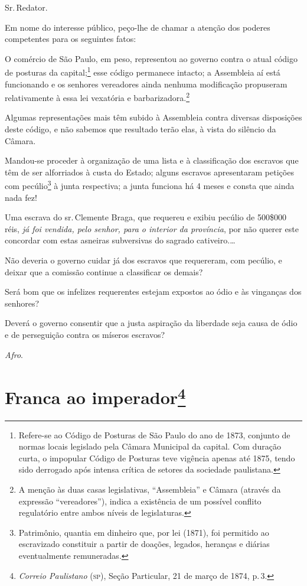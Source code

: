 Sr.\,Redator.

Em nome do interesse público, peço-lhe de chamar a atenção dos poderes
competentes para os seguintes fatos:

O comércio de São Paulo, em peso, representou ao governo contra o atual
código de posturas da capital;\footnote{ Refere-se ao Código de
  Posturas de São Paulo do ano de 1873, conjunto de normas locais
  legislado pela Câmara Municipal da capital. Com duração curta, o
  impopular Código de Posturas teve vigência apenas até 1875, tendo sido
  derrogado após intensa crítica de setores da sociedade paulistana.}
esse código permanece intacto; a Assembleia aí está funcionando e os
senhores vereadores ainda nenhuma modificação propuseram relativamente à
essa lei vexatória e barbarizadora.\footnote{ A menção às duas casas
  legislativas, ``Assembleia'' e Câmara (através da expressão
  ``vereadores''), indica a existência de um possível conflito regulatório
  entre ambos níveis de legislaturas.}

Algumas representações mais têm subido à Assembleia contra diversas
disposições deste código, e não sabemos que resultado terão elas, à
vista do silêncio da Câmara.

Mandou-se proceder à organização de uma lista e à classificação dos
escravos que têm de ser alforriados à custa do Estado; alguns escravos
apresentaram petições com pecúlio\footnote{ Patrimônio, quantia em
  dinheiro que, por lei (1871), foi permitido ao escravizado constituir
  a partir de doações, legados, heranças e diárias eventualmente
  remuneradas.} à junta respectiva; a junta funciona há 4 meses e consta
que ainda nada fez!

Uma escrava do sr.\,Clemente Braga, que requereu e exibiu pecúlio de
500\$000 réis, \emph{já foi vendida, pelo senhor, para o interior da
província}, por não querer este concordar com estas asneiras subversivas
do sagrado cativeiro.\ldots{}

Não deveria o governo cuidar já dos escravos que requereram, com
pecúlio, e deixar que a comissão continue a classificar os demais?

Será bom que os infelizes requerentes estejam expostos ao ódio e às
vinganças dos senhores?

Deverá o governo consentir que a justa aspiração da liberdade seja causa
de ódio e de perseguição contra os míseros escravos?

\emph{Afro}.

\chapter{Franca ao imperador\footnote{\emph{Correio Paulistano} (\textsc{sp}), Seção Particular,
  21 de março de 1874, p.\,3.}} %

